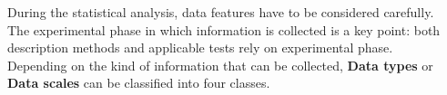 




\begin{frame}
  \vspace*{.75cm}
  During the statistical analysis, data features have to be considered carefully. \\
  \vspace*{.5cm}
  The experimental phase in which information is collected is a key point: both description methods and applicable tests rely on experimental phase. \\
  \vspace*{.75cm}
  Depending on the kind of information that can be collected, \textbf{Data types} or \textbf{Data scales} can be classified into four classes.
\end{frame}

